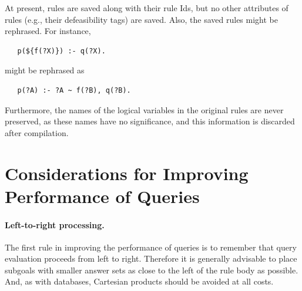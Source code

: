 \documentclass[11pt]{article}
\newcommand{\ERGO}{\mbox{\smaller{\ensuremath{\cal{E}}\smaller{{\sc{RGO}}}}}\xspace}
\newcommand{\FLSYSTEM}{\ERGO}
\begin{document}
At present, rules are saved along with their rule Ids, but no other
attributes of rules (e.g., their defeasibility tags)
are saved. Also, the saved rules might be rephrased. For instance,
\begin{verbatim}
   p(${f(?X)}) :- q(?X).
\end{verbatim}
might be rephrased as
\begin{verbatim}
   p(?A) :- ?A ~ f(?B), q(?B).
\end{verbatim}
Furthermore, the names of the logical variables in the original rules are never
preserved, as these names have no significance, and
this information is discarded after compilation.



\section{Considerations for Improving Performance of Queries}

\paragraph{Left-to-right processing.}
The first rule in improving the performance of \FLSYSTEM queries is to
remember that query evaluation proceeds from left to right. Therefore it is
generally advisable to place subgoals with smaller answer sets as close to
the left of the rule body as possible. And, as with databases, Cartesian
products should be avoided at all costs.
\end{document}
